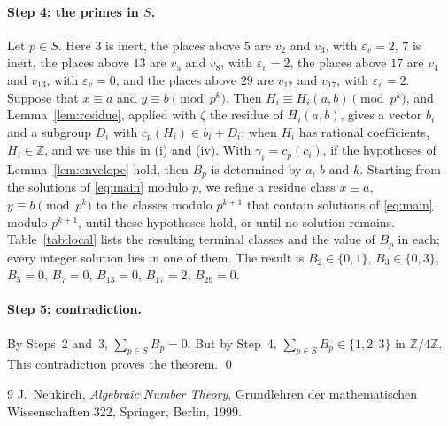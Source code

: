 \documentclass[11pt]{article}
\newcommand{\Z}{\mathbb{Z}}
\begin{document}
\paragraph{Step 4: the primes in $S$.} Let $p\in S$. Here $3$ is inert, the places above $5$ are $v_{2}$ and $v_{3}$, with $\varepsilon_v=2$, $7$ is inert, the places above $13$ are $v_{5}$ and $v_{8}$, with $\varepsilon_v=2$, the places above $17$ are $v_{4}$ and $v_{13}$, with $\varepsilon_v=0$, and the places above $29$ are $v_{12}$ and $v_{17}$, with $\varepsilon_v=2$. Suppose that $x\equiv a$ and $y\equiv b\pmod{p^k}$. Then $H_i\equiv H_i(a,b)\pmod{p^k}$, and Lemma~\ref{lem:residue}, applied with $\zeta$ the residue of $H_i(a,b)$, gives a vector $b_i$ and a subgroup $D_i$ with $c_p(H_i)\in b_i+D_i$; when $H_i$ has rational coefficients, $H_i\in\Z$, and we use this in (i) and (iv). With $\gamma_i=c_p(c_i)$, if the hypotheses of Lemma~\ref{lem:envelope} hold, then $B_p$ is determined by $a$, $b$ and $k$. Starting from the solutions of \eqref{eq:main} modulo $p$, we refine a residue class $x\equiv a$, $y\equiv b\pmod{p^k}$ to the classes modulo $p^{k+1}$ that contain solutions of \eqref{eq:main} modulo $p^{k+1}$, until these hypotheses hold, or until no solution remains. Table~\ref{tab:local} lists the resulting terminal classes and the value of $B_p$ in each; every integer solution lies in one of them. The result is $B_{2}\in\{0,1\}$, $B_{3}\in\{0,3\}$, $B_{5}=0$, $B_{7}=0$, $B_{13}=0$, $B_{17}=2$, $B_{29}=0$.

\paragraph{Step 5: contradiction.} By Steps~2 and~3, $\sum_{p\in S}B_p=0$. But by Step~4, $\sum_{p\in S}B_p\in\{1,2,3\}$ in $\Z/4\Z$. This contradiction proves the theorem.
\qed


\begin{thebibliography}{9}
 J.~Neukirch, \emph{Algebraic Number Theory}, Grundlehren der mathematischen Wissenschaften 322, Springer, Berlin, 1999.
\end{thebibliography}
\end{document}
